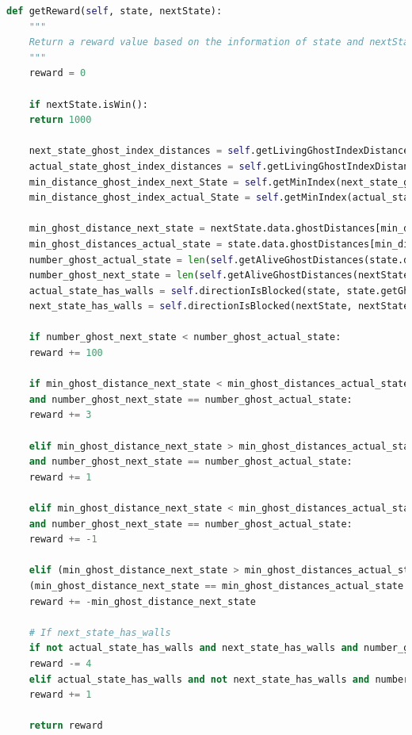 \documentclass[11pt]{exam}
\begin{document}
\begin{lstlisting}[language=python, basicstyle=\footnotesize]
def getReward(self, state, nextState):
	"""
	Return a reward value based on the information of state and nextState
	"""	
	reward = 0
	
	if nextState.isWin():
	return 1000
	
	next_state_ghost_index_distances = self.getLivingGhostIndexDistances(nextState)
	actual_state_ghost_index_distances = self.getLivingGhostIndexDistances(nextState)
	min_distance_ghost_index_next_State = self.getMinIndex(next_state_ghost_index_distances)[0]
	min_distance_ghost_index_actual_State = self.getMinIndex(actual_state_ghost_index_distances)[0]
	
	min_ghost_distance_next_state = nextState.data.ghostDistances[min_distance_ghost_index_next_State]
	min_ghost_distances_actual_state = state.data.ghostDistances[min_distance_ghost_index_actual_State]
	number_ghost_actual_state = len(self.getAliveGhostDistances(state.data.ghostDistances))
	number_ghost_next_state = len(self.getAliveGhostDistances(nextState.data.ghostDistances))
	actual_state_has_walls = self.directionIsBlocked(state, state.getGhostPositions()[min_distance_ghost_index_next_State])
	next_state_has_walls = self.directionIsBlocked(nextState, nextState.getGhostPositions()[min_distance_ghost_index_next_State])
	
	if number_ghost_next_state < number_ghost_actual_state:
	reward += 100
	
	if min_ghost_distance_next_state < min_ghost_distances_actual_state and not actual_state_has_walls \
	and number_ghost_next_state == number_ghost_actual_state:
	reward += 3
	
	elif min_ghost_distance_next_state > min_ghost_distances_actual_state and actual_state_has_walls \
	and number_ghost_next_state == number_ghost_actual_state:
	reward += 1
	
	elif min_ghost_distance_next_state < min_ghost_distances_actual_state and actual_state_has_walls \
	and number_ghost_next_state == number_ghost_actual_state:
	reward += -1
	
	elif (min_ghost_distance_next_state > min_ghost_distances_actual_state and not actual_state_has_walls) or \
	(min_ghost_distance_next_state == min_ghost_distances_actual_state and number_ghost_next_state == number_ghost_actual_state):
	reward += -min_ghost_distance_next_state
	
	# If next_state_has_walls
	if not actual_state_has_walls and next_state_has_walls and number_ghost_next_state == number_ghost_actual_state:
	reward -= 4
	elif actual_state_has_walls and not next_state_has_walls and number_ghost_next_state == number_ghost_actual_state:
	reward += 1
	
	return reward
\end{lstlisting}
\end{document}
